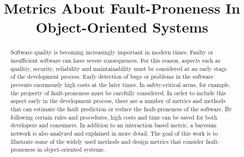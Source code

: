 \documentclass[conference]{IEEEtran}
\begin{document}
\title{Metrics About Fault-Proneness In Object-Oriented Systems}

\author{
}

% 

\maketitle

\begin{abstract}
	Software quality is becoming increasingly important in modern times. Faulty or insufficient software can have severe consequences. For this reason, aspects such as qualitiy, security, reliability and maintainability must be considered at an early stage of the development process. Early detection of bugs or problems in the software prevents enormously high costs at the later times. In safety-critical areas, for example, the property of fault-proneness must be carefully considered. In order to include this aspect early in the development process, there are a number of metrics and methods that can estimate the fault prediction or reduce the fault-proneness of the software. By following certain rules and procedures, high costs and time can be saved for both developers and consumers. In addition to an interaction based metric, a bayesian network is also analyzed and explained in more detail.
	The goal of this work is to illustrate some of the widely used methods and design metrics that consider fault-proneness in object-oriented systems.
	
\end{abstract}









%



\end{document}
